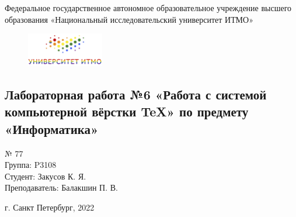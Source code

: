 \begin{center}
\large
Федеральное государственное автономное образовательное учреждение высшего образования
«Национальный исследовательский университет ИТМО» 
\end{center}
\begin{figure}[h]
\centering
\includegraphics[width=0.3\textwidth]{itmo_logo.png}
\end{figure}
\vspace{1cm}
\begin{center}
\section*{Лабораторная работа №6 «Работа с системой компьютерной вёрстки \TeX» по предмету \\«Информатика»}
\end{center}
\vspace{9cm}
\begin{flushleft}
 № 77\\Группа: P3108\\Студент: Закусов К. Я.\\Преподаватель: Балакшин П. В.\\
\end{flushleft}
\vspace{3cm}
\begin{center}
\vspace{2cm}
г. Санкт Петербург, 2022
\end{center}
\thispagestyle{empty}